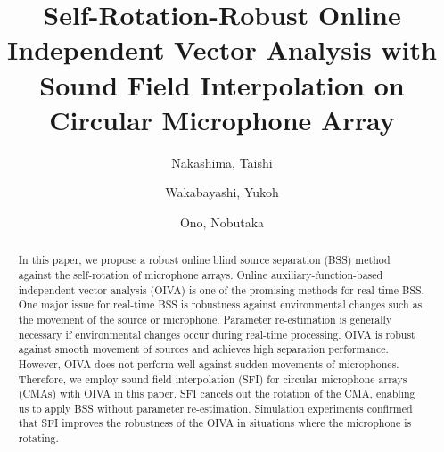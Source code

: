 \documentclass[sip,biber]{now-journal}
\title{Self-Rotation-Robust Online Independent Vector Analysis with\\Sound Field Interpolation on Circular Microphone Array}
\author{Nakashima, Taishi}
\affil{Tokyo Metropolitan University, Tokyo, Japan}
\author{Wakabayashi, Yukoh}
\affil{Toyohashi University of Technology, Aichi, Japan}
\author[1]{Ono, Nobutaka}
\begin{document}
\begin{abstract}
  In this paper, we propose a robust online blind source separation (BSS) method against the self-rotation of microphone arrays.
  Online auxiliary-function-based independent vector analysis (OIVA) is one of the promising methods for real-time BSS.
  One major issue for real-time BSS is robustness against environmental changes such as the movement of the source or microphone.
  Parameter re-estimation is generally necessary if environmental changes occur during real-time processing.
  OIVA is robust against smooth movement of sources and achieves high separation performance.
  However, OIVA does not perform well against sudden movements of microphones.
  Therefore, we employ sound field interpolation (SFI) for circular microphone arrays (CMAs) with OIVA in this paper.
  SFI cancels out the rotation of the CMA, enabling us to apply BSS without parameter re-estimation.
  Simulation experiments confirmed that SFI improves the robustness of the OIVA in situations where the microphone is rotating.
\end{abstract}
\end{document}
